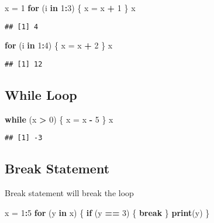 \documentclass[
]{article}
\newenvironment{Shaded}{\begin{snugshade}}{\end{snugshade}}
\newcommand{\ControlFlowTok}[1]{\textcolor[rgb]{0.13,0.29,0.53}{\textbf{#1}}}
\newcommand{\DecValTok}[1]{\textcolor[rgb]{0.00,0.00,0.81}{#1}}
\newcommand{\FunctionTok}[1]{\textcolor[rgb]{0.13,0.29,0.53}{\textbf{#1}}}
\newcommand{\NormalTok}[1]{#1}
\newcommand{\OtherTok}[1]{\textcolor[rgb]{0.56,0.35,0.01}{#1}}
\newcommand{\SpecialCharTok}[1]{\textcolor[rgb]{0.81,0.36,0.00}{\textbf{#1}}}
\begin{document}
\begin{Shaded}
\begin{Highlighting}[]
\NormalTok{x }\OtherTok{=} \DecValTok{1}
\ControlFlowTok{for}\NormalTok{ (i }\ControlFlowTok{in} \DecValTok{1}\SpecialCharTok{:}\DecValTok{3}\NormalTok{) \{}
\NormalTok{  x }\OtherTok{=}\NormalTok{ x }\SpecialCharTok{+} \DecValTok{1}
\NormalTok{\}}
\NormalTok{x}
\end{Highlighting}
\end{Shaded}

\begin{verbatim}
## [1] 4
\end{verbatim}

\begin{Shaded}
\begin{Highlighting}[]
\ControlFlowTok{for}\NormalTok{ (i }\ControlFlowTok{in} \DecValTok{1}\SpecialCharTok{:}\DecValTok{4}\NormalTok{) \{}
\NormalTok{  x }\OtherTok{=}\NormalTok{ x }\SpecialCharTok{+} \DecValTok{2}
\NormalTok{\}}
\NormalTok{x}
\end{Highlighting}
\end{Shaded}

\begin{verbatim}
## [1] 12
\end{verbatim}

\subsection{While Loop}\label{while-loop}

\begin{Shaded}
\begin{Highlighting}[]
\ControlFlowTok{while}\NormalTok{ (x }\SpecialCharTok{\textgreater{}} \DecValTok{0}\NormalTok{) \{}
\NormalTok{  x }\OtherTok{=}\NormalTok{ x }\SpecialCharTok{{-}} \DecValTok{5}
\NormalTok{\}}
\NormalTok{x}
\end{Highlighting}
\end{Shaded}

\begin{verbatim}
## [1] -3
\end{verbatim}

\subsection{Break Statement}\label{break-statement}

Break statement will break the loop

\begin{Shaded}
\begin{Highlighting}[]
\NormalTok{x }\OtherTok{=} \DecValTok{1}\SpecialCharTok{:}\DecValTok{5}
\ControlFlowTok{for}\NormalTok{ (y }\ControlFlowTok{in}\NormalTok{ x) \{}
  \ControlFlowTok{if}\NormalTok{ (y }\SpecialCharTok{==} \DecValTok{3}\NormalTok{) \{}
    \ControlFlowTok{break}
\NormalTok{  \}}
  \FunctionTok{print}\NormalTok{(y)}
\NormalTok{\}}
\end{Highlighting}
\end{Shaded}
\end{document}
